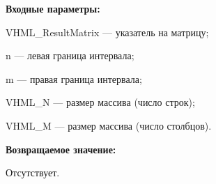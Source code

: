 \textbf{Входные параметры:}
 
VHML\_ResultMatrix --- указатель на матрицу;
 
n --- левая граница интервала;
 
m --- правая граница интервала;
 
VHML\_N --- размер массива (число строк);
 
VHML\_M --- размер массива (число столбцов).

\textbf{Возвращаемое значение:}

Отсутствует.